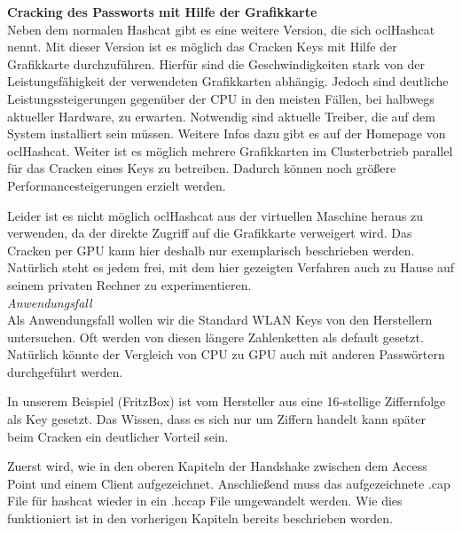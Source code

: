 



\textbf{Cracking des Passworts mit Hilfe der Grafikkarte}\\

Neben dem normalen Hashcat gibt es eine weitere Version, die sich oclHashcat nennt. Mit dieser Version ist es möglich das Cracken Keys mit Hilfe der Grafikkarte durchzuführen. Hierfür sind die Geschwindigkeiten stark von der Leistungsfähigkeit der verwendeten Grafikkarten abhängig. 
Jedoch sind deutliche Leistungssteigerungen gegenüber der CPU in den meisten Fällen, bei halbwegs aktueller Hardware, zu erwarten. Notwendig sind aktuelle Treiber, die auf dem System installiert sein müssen. Weitere Infos dazu gibt es auf der Homepage von oclHashcat. 
Weiter ist es möglich mehrere Grafikkarten im Clusterbetrieb parallel für das Cracken eines Keys zu betreiben. Dadurch können noch größere Performancesteigerungen erzielt werden.

Leider ist es nicht möglich oclHashcat aus der virtuellen Maschine heraus zu verwenden, da der direkte Zugriff auf die Grafikkarte verweigert wird. Das Cracken per GPU kann hier deshalb nur exemplarisch beschrieben werden. Natürlich steht es jedem frei, mit dem hier gezeigten Verfahren auch zu Hause auf seinem privaten Rechner zu experimentieren.\\

\textit{Anwendungsfall}\\

Als Anwendungsfall wollen wir die Standard WLAN Keys von den Herstellern untersuchen. Oft werden von diesen längere Zahlenketten als default gesetzt. Natürlich könnte der Vergleich von CPU zu GPU auch mit anderen Passwörtern durchgeführt werden. 

In unserem Beispiel (FritzBox) ist vom Hersteller aus eine 16-stellige Ziffernfolge als Key gesetzt. Das Wissen, dass es sich nur um Ziffern handelt kann später beim Cracken ein deutlicher Vorteil sein.

Zuerst wird, wie in den oberen Kapiteln der Handshake zwischen dem Access Point und einem Client aufgezeichnet. Anschließend muss das aufgezeichnete .cap File für hashcat wieder in ein .hccap File umgewandelt werden. Wie dies funktioniert ist in den vorherigen Kapiteln bereits beschrieben worden. \\

